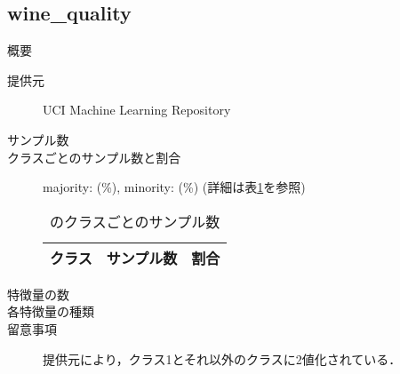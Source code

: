 \subsection{wine\_quality}
\begin{description}
    \item[概要] \cite{}
    \item[提供元] UCI Machine Learning Repository
    \item[サンプル数] 
    \item[クラスごとのサンプル数と割合] majority:  (\%), minority:  (\%) (詳細は表\ref{tab:}を参照)

        \begin{table}
            \centering
            \caption{のクラスごとのサンプル数}
            \label{tab:}
            \begin{tabular}{lrc} \hline
                \multicolumn{1}{c}{クラス}&
                \multicolumn{1}{c}{サンプル数}&
                \multicolumn{1}{c}{割合}\\
                \hline
                \hline

                \hline
            \end{tabular}
        \end{table}

    \item[特徴量の数] 
    \item[各特徴量の種類] \mbox{}
        
    \item[留意事項] 提供元により，クラス1とそれ以外のクラスに2値化されている．
\end{description}


